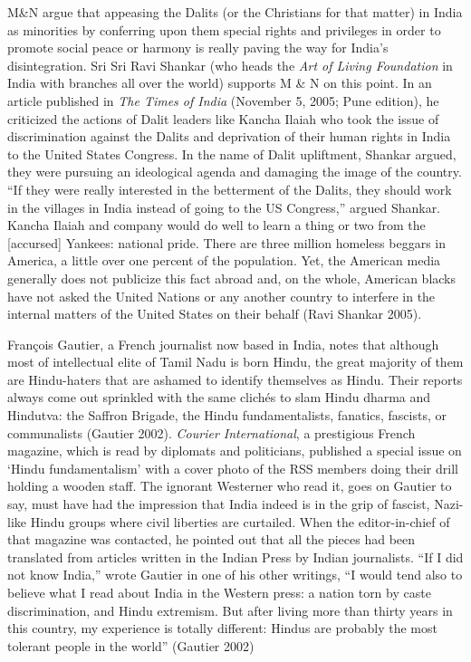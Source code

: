 M\&N argue that appeasing the Dalits (or the Christians for that matter) in India as minorities by conferring upon them special rights and privileges in order to promote social peace or harmony is really paving the way for India’s disintegration. Sri Sri Ravi Shankar (who heads the \textit{Art of Living Foundation} in India with branches all over the world) supports M \& N on this point. In an article published in \textit{The Times of India} (November 5, 2005; Pune edition), he criticized the actions of Dalit leaders like Kancha Ilaiah who took the issue of discrimination against the Dalits and deprivation of their human rights in India to the United States Congress. In the name of Dalit upliftment, Shankar argued, they were pursuing an ideological agenda and damaging the image of the country. “If they were really interested in the betterment of the Dalits, they should work in the villages in India instead of going to the US Congress,” argued Shankar. Kancha Ilaiah and company would do well to learn a thing or two from the [accursed] Yankees: national pride. There are three million homeless beggars in America, a little over one percent of the population. Yet, the American media generally does not publicize this fact abroad and, on the whole, American blacks have not asked the United Nations or any another country to interfere in the internal matters of the United States on their behalf (Ravi Shankar 2005).

François Gautier, a French journalist now based in India, notes that although most of intellectual elite of Tamil Nadu is born Hindu, the great majority of them are Hindu-haters that are ashamed to identify themselves as Hindu. Their reports always come out sprinkled with the same clichés to slam Hindu dharma and Hindutva: the Saffron Brigade, the Hindu fundamentalists, fanatics, fascists, or communalists (Gautier 2002). \textit{Courier International}, a prestigious French magazine, which is read by diplomats and politicians, published a special issue on ‘Hindu fundamentalism’ with a cover photo of the RSS members doing their drill holding a wooden staff. The ignorant Westerner who read it, goes on Gautier to say, must have had the impression that India indeed is in the grip of fascist, Nazi-like Hindu groups where civil liberties are curtailed. When the editor-in-chief of that magazine was contacted, he pointed out that all the pieces had been translated from articles written in the Indian Press by Indian journalists. “If I did not know India,” wrote Gautier in one of his other writings, “I would tend also to believe what I read about India in the Western press: a nation torn by caste discrimination, and Hindu extremism. But after living more than thirty years in this country, my experience is totally different: Hindus are probably the most tolerant people in the world” (Gautier 2002)



